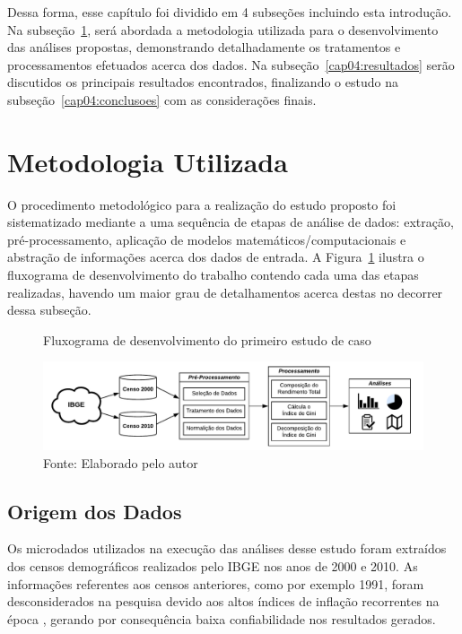 Dessa forma, esse capítulo foi dividido em 4 subseções incluindo esta introdução. Na subseção~\ref{cap04:metodologia}, será abordada a metodologia utilizada para o desenvolvimento das análises propostas, demonstrando detalhadamente os tratamentos e processamentos efetuados acerca dos dados. Na subseção~\ref{cap04:resultados} serão discutidos os principais resultados encontrados, finalizando o estudo na subseção~\ref{cap04:conclusoes} com as considerações finais. 

\section{Metodologia Utilizada}\label{cap04:metodologia}

O procedimento metodológico para a realização do estudo proposto foi sistematizado mediante a uma sequência de etapas de análise de dados: extração, pré-processamento, aplicação de modelos matemáticos/computacionais e abstração de informações acerca dos dados de entrada. A Figura~\ref{fig:cap04:metodologia} ilustra o fluxograma de desenvolvimento do trabalho contendo cada uma das etapas realizadas, havendo um maior grau de detalhamentos acerca destas no decorrer dessa subseção. 

\begin{figure}[!h]
    \centering
    \caption{Fluxograma de desenvolvimento do primeiro estudo de caso}
    \includegraphics[width=\textwidth]{figs/cap04_metodologia_estudo01.pdf}
    \caption*{\footnotesize{Fonte: Elaborado pelo autor}}
    \label{fig:cap04:metodologia}
\end{figure}


\subsection{Origem dos Dados}

Os microdados utilizados na execução das análises desse estudo foram extraídos dos censos demográficos realizados pelo IBGE nos anos de 2000 e 2010. As informações referentes aos censos anteriores, como por exemplo 1991, foram desconsiderados na pesquisa devido aos altos índices de inflação recorrentes na época \cite{cap04_ref13}, gerando por consequência baixa confiabilidade nos resultados gerados.

